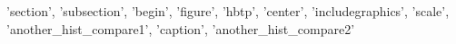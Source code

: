 {'section', 'subsection', 'begin', 'figure', 'hbtp', 'center', 'includegraphics', 'scale', 'another_hist_compare1', 'caption', 'another_hist_compare2'}
